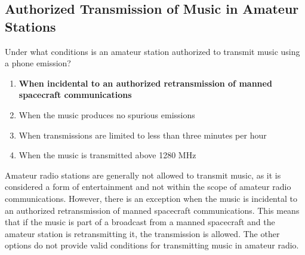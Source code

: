 \subsection{Authorized Transmission of Music in Amateur Stations}\label{T1D04}

\begin{tcolorbox}[colback=gray!10!white,colframe=black!75!black,title=T1D04]
Under what conditions is an amateur station authorized to transmit music using a phone emission?
\begin{enumerate}[label=\Alph*,noitemsep]
    \item \textbf{When incidental to an authorized retransmission of manned spacecraft communications}
    \item When the music produces no spurious emissions
    \item When transmissions are limited to less than three minutes per hour
    \item When the music is transmitted above 1280 MHz
\end{enumerate}
\end{tcolorbox}

Amateur radio stations are generally not allowed to transmit music, as it is considered a form of entertainment and not within the scope of amateur radio communications. However, there is an exception when the music is incidental to an authorized retransmission of manned spacecraft communications. This means that if the music is part of a broadcast from a manned spacecraft and the amateur station is retransmitting it, the transmission is allowed. The other options do not provide valid conditions for transmitting music in amateur radio.
